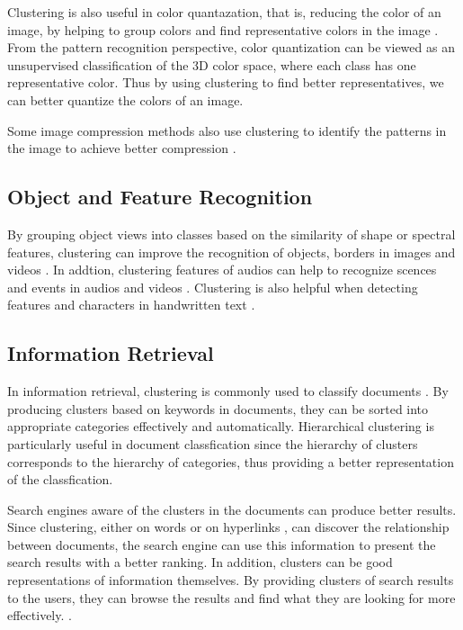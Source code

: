 \documentclass[conference]{IEEEtran}
\begin{document}
Clustering is also useful in color quantazation, that is, reducing the color of an image, by helping to group colors and find representative colors in the image \cite{scheunders1997comparison}. From the pattern recognition perspective, color quantization can be viewed as an unsupervised classification of the 3D color space, where each class has one representative color. Thus by using clustering to find better representatives, we can better quantize the colors of an image.

Some image compression methods also use clustering to identify the patterns in the image to achieve better compression \cite{jain1981image}.

\subsection{Object and Feature Recognition}
By grouping object views into classes based on the similarity of shape or spectral features, clustering can improve the recognition of objects, borders in images and videos \cite{lowe2004distinctive}. In addtion, clustering features of audios can help to recognize scences and events in audios and videos \cite{clarkson1999unsupervised} \cite{liu1998audio}. Clustering is also helpful when detecting features and characters in handwritten text \cite{lu1995machine} \cite{yin2009handwritten}.

\subsection{Information Retrieval}
In information retrieval, clustering is commonly used to classify documents \cite{willett1988recent} \cite{steinbach2000comparison}. By producing clusters based on keywords in documents, they can be sorted into appropriate categories effectively and automatically. Hierarchical clustering is particularly useful in document classfication since the hierarchy of clusters corresponds to the hierarchy of categories, thus providing a better representation of the classfication.

Search engines aware of the clusters in the documents can produce better results. Since clustering, either on words or on hyperlinks \cite{weiss1996hypursuit} \cite{brin1998anatomy}, can discover the relationship between documents, the search engine can use this information to present the search results with a better ranking. In addition, clusters can be good representations of information themselves. By providing clusters of search results to the users, they can browse the results and find what they are looking for more effectively. \cite{cutting1992scatter}.
\end{document}
